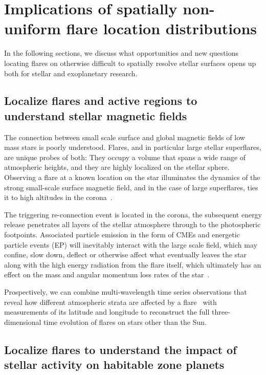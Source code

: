 \documentclass[proof]{WileyASNA-v1}
\begin{document}
\section{Implications of spatially non-uniform flare location distributions}
\label{sec:implications}
In the following sections, we discuss what opportunities and new questions locating flares on otherwise difficult to spatially resolve stellar surfaces opens up both for stellar and exoplanetary research.


\subsection{Localize flares and active regions to understand stellar magnetic fields}\label{sec:mf}

The connection between small scale surface and global magnetic fields of low mass stars is poorly understood. Flares, and in particular large stellar superflares, are unique probes of both: They occupy a volume that spans a wide range of atmospheric heights, and they are highly localized on the stellar sphere. Observing a flare at a known location on the star illuminates the dynamics of the strong small-scale surface magnetic field, and in the case of large superflares, ties it to high altitudes in the corona~\citep{benz2010}.

The triggering re-connection event is located in the corona, the subsequent energy release penetrates all layers of the stellar atmosphere through to the photospheric footpoints. Associated particle emission in the form of CMEs and energetic particle events (EP) will inevitably interact with the large scale field, which may confine, slow down, deflect or otherwise affect what eventually leaves the star along with the high energy radiation from the flare itself, which ultimately has an effect on the mass and angular momentum loss rates of the star~\citep{alvaradogomez2018,alvaradogomez2019,kay2019}. 

Prospectively, we can combine multi-wavelength time series observations that reveal how different atmospheric strata are affected by a flare~\citep{kowalski2013, maehara2021} with measurements of its latitude and longitude to reconstruct the full three-dimensional time evolution of flares on stars other than the Sun. 
\subsection{Localize flares to understand the impact of stellar activity on habitable zone planets}\label{sec:planets}
\end{document}
